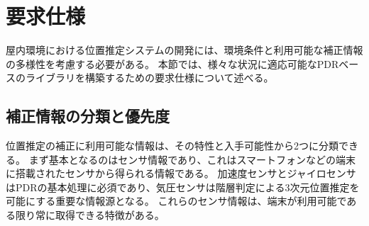 



%
%
%

\section{要求仕様}

屋内環境における位置推定システムの開発には、環境条件と利用可能な補正情報の多様性を考慮する必要がある。
本節では、様々な状況に適応可能なPDRベースのライブラリを構築するための要求仕様について述べる。


\subsection{補正情報の分類と優先度}

位置推定の補正に利用可能な情報は、その特性と入手可能性から2つに分類できる。
まず基本となるのはセンサ情報であり、これはスマートフォンなどの端末に搭載されたセンサから得られる情報である。
加速度センサとジャイロセンサはPDRの基本処理に必須であり、気圧センサは階層判定による3次元位置推定を可能にする重要な情報源となる。
これらのセンサ情報は、端末が利用可能である限り常に取得できる特徴がある。

